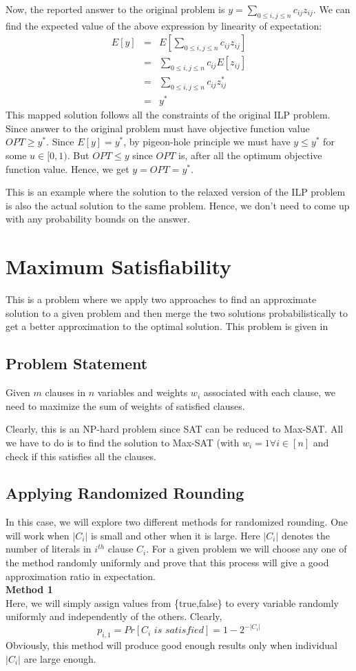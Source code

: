 Now, the reported answer to the original problem is
$
y = \sum\limits_{0\leq i,j \leq n} c_{ij}z_{ij}
$.
We can find the expected value of the above expression by linearity of expectation:
\[
\begin{array}{rcl}
E[y] & = & E[\sum\limits_{0\leq i,j \leq n} c_{ij}z_{ij}]\\
 & = & \sum\limits_{0\leq i,j \leq n} c_{ij}E[z_{ij}] \\
&	=	& \sum\limits_{0\leq i,j \leq n} c_{ij}z_{ij}^* \\
&	=	& y^*
\end{array}
\]
This mapped solution follows all the constraints of the original ILP problem. Since answer to the original problem must have objective function value $OPT \geq y^*$. Since $E[y] = y^*$, by pigeon-hole principle we must have $y \leq y^*$ for some $u \in [0,1)$. But $OPT \leq y$ since $OPT$ is, after all the optimum objective function value. Hence, we get $y = OPT = y^*$.

This is an example where the solution to the relaxed version of the ILP problem is also the actual solution to the same problem. Hence, we don't need to come up with any probability bounds on the answer.

\section{Maximum Satisfiability}
This is a problem where we apply two approaches to find an approximate solution to a given problem and then merge the two solutions probabilistically to get a better approximation to the optimal solution. This problem is given in \cite{srinivasan}
\subsection{Problem Statement}
Given $m$ clauses in $n$ variables and weights $w_i$ associated with each clause, we need to maximize the sum of weights of satisfied clauses.

Clearly, this is an NP-hard problem since SAT can be reduced to Max-SAT. All we have to do is to find the solution to Max-SAT (with $w_i = 1\forall i\in [n]$ and check if this satisfies all the clauses.

\subsection{Applying Randomized Rounding}
In this case, we will explore two different methods for randomized rounding. One will work when $|C_i|$ is small and other when it is large. Here $|C_i|$ denotes the number of literals in $i^{th}$ clause $C_i$. For a given problem we will choose any one of the method randomly uniformly and prove that this process will give a good approximation ratio in expectation.\\
\noindent
{\bf Method 1}\\
Here, we will simply assign values from \{true,false\} to every variable randomly uniformly and independently of the others. Clearly,\[ p_{i,1} = Pr[C_i \,\, is \,\, satisfied] = 1 - 2^{-|C_i|} 
\]
Obviously, this method will produce good enough results only when individual $|C_i|$ are large enough.


